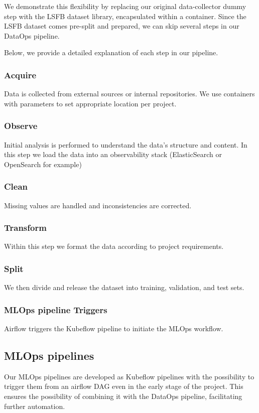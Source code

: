We demonstrate this flexibility by replacing our original data-collector dummy step with the LSFB dataset library\cite{9534336}, encapsulated within a container.
Since the LSFB dataset comes pre-split and prepared, we can skip several steps in our DataOps pipeline.

Below, we provide a detailed explanation of each step in our pipeline.

\subsubsection{Acquire}
Data is collected from external sources or internal repositories.
We use containers with parameters to set appropriate location per project.

\subsubsection{Observe}
Initial analysis is performed to understand the data's structure and content.
In this step we load the data into an observability stack (ElasticSearch or OpenSearch for example)

\subsubsection{Clean}
Missing values are handled and inconsistencies are corrected.

\subsubsection{Transform}
Within this step we format the data according to project requirements.

\subsubsection{Split}
We then divide and release the dataset into training, validation, and test sets.

\subsubsection{MLOps pipeline Triggers}
Airflow triggers the Kubeflow pipeline to initiate the MLOps workflow.

\subsection{MLOps pipelines}\label{subsec:mlops-pipelines}
Our MLOps pipelines are developed as Kubeflow pipelines with the possibility to trigger them from an airflow DAG
even in the early stage of the project.
This ensures the possibility of combining it with the DataOps pipeline, facilitating further automation.

